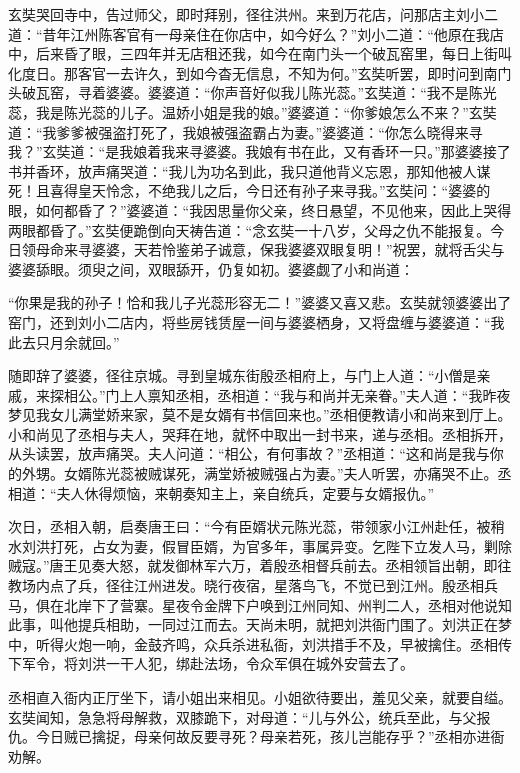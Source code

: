 \documentclass[12pt]{lsbook}
\begin{document}
玄奘哭回寺中，告过师父，即时拜别，径往洪州。来到万花店，问那店主刘小二道：“昔年江州陈客官有一母亲住在你店中，如今好么？”刘小二道：“他原在我店中，后来昏了眼，三四年并无店租还我，如今在南门头一个破瓦窑里，每日上街叫化度日。那客官一去许久，到如今杳无信息，不知为何。”玄奘听罢，即时问到南门头破瓦窑，寻着婆婆。婆婆道：“你声音好似我儿陈光蕊。”玄奘道：“我不是陈光蕊，我是陈光蕊的儿子。温娇小姐是我的娘。”婆婆道：“你爹娘怎么不来？”玄奘道：“我爹爹被强盗打死了，我娘被强盗霸占为妻。”婆婆道：“你怎么晓得来寻我？”玄奘道：“是我娘着我来寻婆婆。我娘有书在此，又有香环一只。”那婆婆接了书并香环，放声痛哭道：“我儿为功名到此，我只道他背义忘恩，那知他被人谋死！且喜得皇天怜念，不绝我儿之后，今日还有孙子来寻我。”玄奘问：“婆婆的眼，如何都昏了？”婆婆道：“我因思量你父亲，终日悬望，不见他来，因此上哭得两眼都昏了。”玄奘便跪倒向天祷告道：“念玄奘一十八岁，父母之仇不能报复。今日领母命来寻婆婆，天若怜鉴弟子诚意，保我婆婆双眼复明！”祝罢，就将舌尖与婆婆舔眼。须臾之间，双眼舔开，仍复如初。婆婆觑了小和尚道：

“你果是我的孙子！恰和我儿子光蕊形容无二！”婆婆又喜又悲。玄奘就领婆婆出了窑门，还到刘小二店内，将些房钱赁屋一间与婆婆栖身，又将盘缠与婆婆道：“我此去只月余就回。”

随即辞了婆婆，径往京城。寻到皇城东街殷丞相府上，与门上人道：“小僧是亲戚，来探相公。”门上人禀知丞相，丞相道：“我与和尚并无亲眷。”夫人道：“我昨夜梦见我女儿满堂娇来家，莫不是女婿有书信回来也。”丞相便教请小和尚来到厅上。小和尚见了丞相与夫人，哭拜在地，就怀中取出一封书来，递与丞相。丞相拆开，从头读罢，放声痛哭。夫人问道：“相公，有何事故？”丞相道：“这和尚是我与你的外甥。女婿陈光蕊被贼谋死，满堂娇被贼强占为妻。”夫人听罢，亦痛哭不止。丞相道：“夫人休得烦恼，来朝奏知主上，亲自统兵，定要与女婿报仇。”

次日，丞相入朝，启奏唐王曰：“今有臣婿状元陈光蕊，带领家小江州赴任，被稍水刘洪打死，占女为妻，假冒臣婿，为官多年，事属异变。乞陛下立发人马，剿除贼寇。”唐王见奏大怒，就发御林军六万，着殷丞相督兵前去。丞相领旨出朝，即往教场内点了兵，径往江州进发。晓行夜宿，星落鸟飞，不觉已到江州。殷丞相兵马，俱在北岸下了营寨。星夜令金牌下户唤到江州同知、州判二人，丞相对他说知此事，叫他提兵相助，一同过江而去。天尚未明，就把刘洪衙门围了。刘洪正在梦中，听得火炮一响，金鼓齐鸣，众兵杀进私衙，刘洪措手不及，早被擒住。丞相传下军令，将刘洪一干人犯，绑赴法场，令众军俱在城外安营去了。

丞相直入衙内正厅坐下，请小姐出来相见。小姐欲待要出，羞见父亲，就要自缢。玄奘闻知，急急将母解救，双膝跪下，对母道：“儿与外公，统兵至此，与父报仇。今日贼已擒捉，母亲何故反要寻死？母亲若死，孩儿岂能存乎？”丞相亦进衙劝解。
\end{document}
